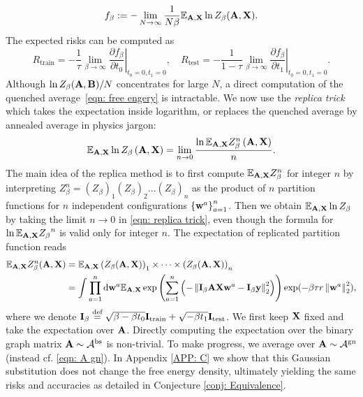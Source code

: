 \documentclass[9pt,twocolumn]{pnas-new}
\begin{document}
\begin{equation}\label{eqn: free engery}
    f_\beta:= -\lim_{N\to\infty} \frac{1}{N\beta} \mathbb{E}_{\mathbf{A},\mathbf{X}}\ln Z_\beta(\mathbf{A},\mathbf{X}).
\end{equation}
The expected risks can be computed as
\begin{equation}\label{eqn: risk in f}
        R_{\text{train}} = -\frac{1}{\tau}\lim_{\beta \to \infty} \left. \frac{\partial f_\beta}{\partial t_0} \right \vert_{t_0=0,t_1=0}, \quad
    R_{\text{test}} = -\frac{1}{1-\tau}\lim_{\beta \to \infty} \left. \frac{\partial f_\beta}{\partial t_1} \right \vert_{t_0=0,t_1=0}.
\end{equation}
Although $\ln Z_{\beta}(\mathbf{A},\mathbf{B})/N$ concentrates for large $N$, a direct computation of the quenched average~\eqref{eqn: free engery} is intractable. We now use the \emph{replica trick} which takes the expectation inside logarithm, or replaces the quenched average by annealed average in physics jargon:
\begin{equation}\label{eqn: replica trick}
    \mathbb{E}_{\mathbf{A},\mathbf{X}} \ln Z_\beta \left(\mathbf{A},\mathbf{X}\right)  =\lim_{n \to 0 } \frac{\ln \mathbb{E}_{\mathbf{A},\mathbf{X}}{Z_\beta^ n} \left(\mathbf{A},\mathbf{X}\right)}{n}.
\end{equation}
The main idea of the replica method is to first compute $\mathbb{E}_{\mathbf{A},\mathbf{X}}{Z_\beta^ n}$ for integer $n$ by interpreting $Z_\beta^n=(Z_\beta)_1(Z_\beta)_2\ldots(Z_\beta)_n$ as the product of $n$ partition functions for $n$ independent configurations $\left\{\mathbf{w}^a\right\}_{a=1}^n$.  Then we obtain $\mathbb{E}_{\mathbf{A},\mathbf{X}}\ln {Z_\beta}$ by taking the limit $n \to 0$ in \eqref{eqn: replica trick}, even though the formula for $\ln\mathbb{E}_{\mathbf{A},\mathbf{X}}{Z_\beta}^n$ is valid only for integer $n$. The expectation of replicated partition function reads 
\begin{equation}\label{eqn: Z long}
\begin{aligned}
  \mathbb{E}_{\mathbf{A},\mathbf{X}}Z^{n}_{\beta}(\mathbf{A},\mathbf{X})&=\mathbb{E}_{\mathbf{A},\mathbf{X}}\left(Z_{\beta}(\mathbf{A},\mathbf{X})\right)_{1}\times\cdots\times \left(Z_{\beta}(\mathbf{A},\mathbf{X})\right)_{n}\\
  &=\int\prod_{a=1}^{n}\mathrm{d}\mathbf{w}^{a}\mathbb{E}_{\mathbf{A},\mathbf{X}} \exp\left(\sum_{a=1}^{n} \left(-\left\lVert\mathbf{I}_\beta \mathbf{A}\mathbf{X}\mathbf{w}^a-\mathbf{I}_\beta \mathbf{y}\right\rVert_2^2\right) \right)\exp(-\beta \tau r \left\lVert\mathbf{w}^a\right\rVert_2^2),
\end{aligned}
\end{equation}
where we denote $\mathbf{I}_\beta \overset{\text{def}}{=} \sqrt{\beta-\beta t_0}\mathbf{I}_{\text{train}}+\sqrt{-\beta t_1}\mathbf{I}_{\text{test}}$. We first keep $\mathbf{X}$ fixed and take the expectation over $\mathbf{A}$. Directly computing the expectation over the binary graph matrix $\mathbf{A} \sim \mathcal{A}^{\text{bs}}$ is non-trivial. To make progress, we average over $\mathbf{A} \sim \mathcal{A}^{\text{gn}}$ (instead cf. \eqref{eqn: A gn}). In Appendix \ref{APP: C} we show that this Gaussian substitution does not change the free energy density, ultimately yielding the same risks and accuracies as detailed in Conjecture \ref{conj: Equivalence}.
\end{document}
